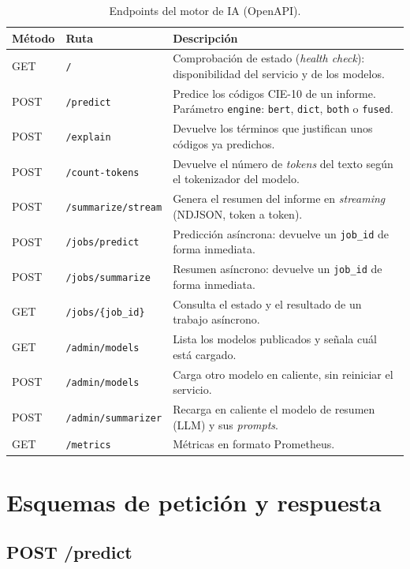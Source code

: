 \begin{table}[h]
\centering
\small
\caption{Endpoints del motor de IA (OpenAPI).}
\label{tab:openapi-endpoints}
\begin{tabular}{llP{7.2cm}}
\hline
\textbf{Método} & \textbf{Ruta} & \textbf{Descripción} \\
\hline
GET & \texttt{/} & Comprobación de estado (\emph{health check}): disponibilidad del servicio y de los modelos. \\
POST & \texttt{/predict} & Predice los códigos CIE-10 de un informe. Parámetro \texttt{engine}: \texttt{bert}, \texttt{dict}, \texttt{both} o \texttt{fused}. \\
POST & \texttt{/explain} & Devuelve los términos que justifican unos códigos ya predichos. \\
POST & \texttt{/count-tokens} & Devuelve el número de \emph{tokens} del texto según el tokenizador del modelo. \\
POST & \texttt{/summarize/stream} & Genera el resumen del informe en \emph{streaming} (NDJSON, token a token). \\
POST & \texttt{/jobs/predict} & Predicción asíncrona: devuelve un \texttt{job\_id} de forma inmediata. \\
POST & \texttt{/jobs/summarize} & Resumen asíncrono: devuelve un \texttt{job\_id} de forma inmediata. \\
GET & \texttt{/jobs/\{job\_id\}} & Consulta el estado y el resultado de un trabajo asíncrono. \\
GET & \texttt{/admin/models} & Lista los modelos publicados y señala cuál está cargado. \\
POST & \texttt{/admin/models} & Carga otro modelo en caliente, sin reiniciar el servicio. \\
POST & \texttt{/admin/summarizer} & Recarga en caliente el modelo de resumen (LLM) y sus \emph{prompts}. \\
GET & \texttt{/metrics} & Métricas en formato Prometheus. \\
\hline
\end{tabular}
\end{table}

\section{Esquemas de petición y respuesta}

\subsection{POST /predict}\label{sec:m-predict}

